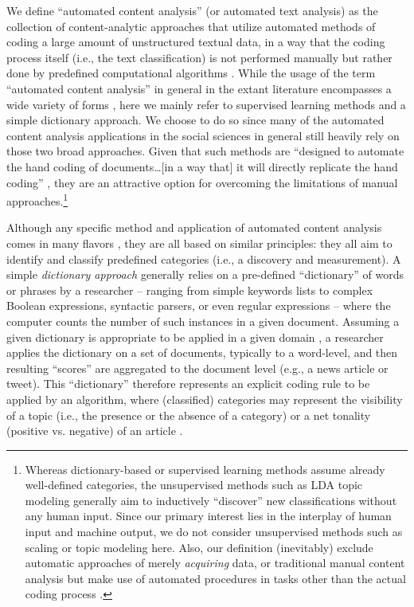 \documentclass[man, floatsintext, 12pt, a4paper, noextraspace]{apa6}
\begin{document}
    We define \enquote{automated content analysis} (or automated text analysis) as the collection of content-analytic approaches that utilize automated methods of coding a large amount of unstructured textual data, in a way that the coding process itself (i.e., the text classification) is not performed manually but rather done by predefined computational algorithms \parencite{trilling2018scaling, grimmer2013text}. While the usage of the term \enquote{automated content analysis} in general in the extant literature encompasses a wide variety of forms \parencites[e.g.,][]{riff2014analyzing, Hopkins_King2010, Krippendorff2013, grimmer2013text}, here we mainly refer to supervised learning methods and a simple dictionary approach. We choose to do so since many of the automated content analysis applications in the social sciences in general still heavily rely on those two broad approaches. Given that such methods are \enquote{designed to automate the hand coding of documents\ldots[in a way that] it will directly replicate the hand coding} \parencites[][p. 13]{grimmer2013text}, they are an attractive option for overcoming the limitations of manual approaches.\footnote{ Whereas dictionary-based or supervised learning methods assume already well-defined categories, the unsupervised methods such as LDA topic modeling \parencites[][]{dimaggio2013exploiting, maier2018applying} generally aim to inductively \enquote{discover} new classifications without any human input. Since our primary interest lies in the interplay of human input and machine output, we do not consider unsupervised methods such as scaling or topic modeling here. Also, our definition (inevitably) exclude automatic approaches of merely \textit{acquiring} data, or traditional manual content analysis but make use of automated procedures in tasks other than the actual coding process \parencites[such as in data entry or data management: e.g.,][]{lewis2013content}.}
    
    Although any specific method and application of automated content analysis comes in many flavors \parencites[for broad overviews, see:][]{Boumans_Trilling_2016, grimmer2013text}, they are all based on similar principles: they all aim to identify and classify predefined categories (i.e., a discovery and measurement). A simple \textit{dictionary approach} generally relies on a pre-defined “dictionary” of words or phrases by a researcher -- ranging from simple keywords lists to complex Boolean expressions, syntactic parsers, or even regular expressions -- where the computer counts the number of such instances in a given document. Assuming a given dictionary is appropriate to be applied in a given domain \parencite{Boumans_Trilling_2016, gonzalez2015signals}, a researcher applies the dictionary on a set of documents, typically to a word-level, and then resulting \enquote{scores} are aggregated to the document level (e.g., a news article or tweet). This \enquote{dictionary} therefore represents an explicit coding rule to be applied by an algorithm, where (classified) categories may represent the visibility of a topic (i.e., the presence or the absence of a category) or a net tonality (positive vs. negative) of an article \parencites[e.g.,][]{Aaldering2016, YoungSoroka2012, boomgaaden2009, gonzalez2015signals, Rooduijn2011}. 
    
\end{document}
